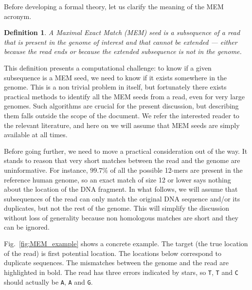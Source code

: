 \documentclass{article}
\newtheorem{definition}{Definition}
\begin{document}
Before developing a formal theory, let us clarify the meaning of the MEM
acronym.

\begin{definition}
A Maximal Exact Match (MEM) seed is a subsequence of a read that is
present in the genome of interest and that cannot be extended --- either
because the read ends or because the extended subsequence is not in the
genome.
\end{definition}

This definition presents a computational challenge: to know if a given
subsequence is a MEM seed, we need to know if it exists somewhere in the
genome. This is a non trivial problem in itself, but fortunately there
exists practical methods to identify all the MEM seeds from a read, even
for very large genomes\cite{ferragina2000opportunistic,
ferragina2005indexing}. Such algorithms are crucial for the present
discussion, but describing them falls outside the scope of the document.
We refer the interested reader to the relevant
literature\cite{pmid24336412,pmid25399029,pmid23349213,pmid19389736,
li2013aligning}, and here on we will assume that MEM seeds are simply
available at all times.

Before going further, we need to move a practical consideration out of the
way. It stands to reason that very short matches between the read and the
genome are uninformative. For instance, $99.7\%$ of all the possible
12-mers are present in the reference human genome, so an exact match of
size 12 or lower says nothing about the location of the DNA fragment.
In what follows, we will assume that subsequences of the read can only
match the original DNA sequence and/or its duplicates, but not the rest of
the genome. This will simplify the discussion without loss of generality
because non homologous matches are short and they can be ignored.

Fig.~\ref{fig:MEM_example} shows a concrete example. The target (the true
location of the read) is first potential location. The locations below
correspond to duplicate sequences. The mismatches between the genome and
the read are highlighted in bold. The read has three errors indicated by
stars, so \texttt{T}, \texttt{T} and \texttt{C} should actually be
\texttt{A}, \texttt{A} and \texttt{G}.
\end{document}
